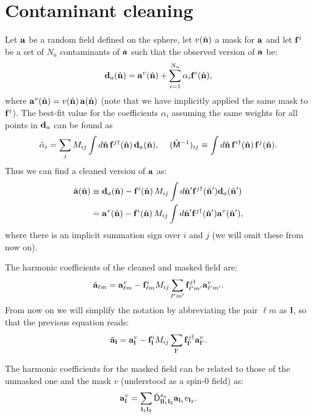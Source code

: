 \documentclass[a4paper,10pt]{article}
\newcommand{\nv}{\hat{\bf n}}
\begin{document}
\section{Contaminant cleaning}
  Let ${\bf a}$ be a random field defined on the sphere, let $v(\nv)$ a mask for ${\bf a}$ and let ${\bf f}^i$ be a set of $N_a$ contaminants of ${\bf a}$ such that the observed version of ${\bf a}$ be:
  \begin{equation}
    {\bf d}_a(\nv)={\bf a}^v(\nv)+\sum_{i=1}^{N_a}\alpha_i{\bf f}^i(\nv),
  \end{equation}
  where ${\bf a}^v(\nv)=v(\nv)\,{\bf a}(\nv)$ (note that we have implicitly applied the same mask to ${\bf f}^i$). The best-fit value for the coefficients $\alpha_i$ assuming the same weights for all points in ${\bf d}_a$ can be found as
  \begin{equation}
    \tilde{\alpha}_i=\sum_jM_{ij}\int d\nv\,{\bf f}^{j\dag}(\nv)\,{\bf d}_a(\nv),\hspace{12pt}
    (\hat{\sf M}^{-1})_{ij}\equiv\int d\nv\,{\bf f}^{i\dag}(\nv)\,{\bf f}^j(\nv).
  \end{equation}
  Thus we can find a cleaned version of ${\bf a}$ as:
  \begin{align}
    \tilde{\bf a}(\nv)&\equiv{\bf d}_a(\nv)-{\bf f}^i(\nv)\,M_{ij}\int d\nv'{\bf f}^{j\dag}(\nv'){\bf d}_a(\nv')\\
                      &={\bf a}^v(\nv)-{\bf f}^i(\nv)\,M_{ij}\int d\nv'{\bf f}^{j\dag}(\nv'){\bf a}^v(\nv'),
  \end{align}
  where there is an implicit summation sign over $i$ and $j$ (we will omit these from now on).
  
  The harmonic coefficients of the cleaned and masked field are:
  \begin{equation}
   \tilde{\bf a}_{\ell m}={\bf a}^v_{\ell m}-{\bf f}^i_{\ell m}M_{ij}\sum_{\ell' m'}{\bf f}^{j\dag}_{\ell' m'}{\bf a}^{v}_{\ell' m'}.
  \end{equation}
  From now on we will simplify the notation by abbreviating the pair $\ell m$ as ${\bf l}$, so that the previous equation reads:
  \begin{equation}
   \tilde{\bf a}_{\bf l}={\bf a}^v_{\bf l}-{\bf f}^i_{\bf l}M_{ij}\sum_{{\bf l}'}{\bf f}^{j\dag}_{{\bf l}'}{\bf a}^{v}_{{\bf l}'}.
  \end{equation}

  The harmonic coefficients for the masked field can be related to those of the unmasked one and the mask $v$ (understood as a spin-0 field) as:
  \begin{equation}
    {\bf a}^v_{\bf l}=\sum_{{\bf l}_1{\bf l}_2}\hat{\sf D}^{s_a}_{{\bf l}{\bf l}_1{\bf l}_2}{\bf a}_{{\bf l}_1}v_{{\bf l}_2}.
  \end{equation}
\end{document}
